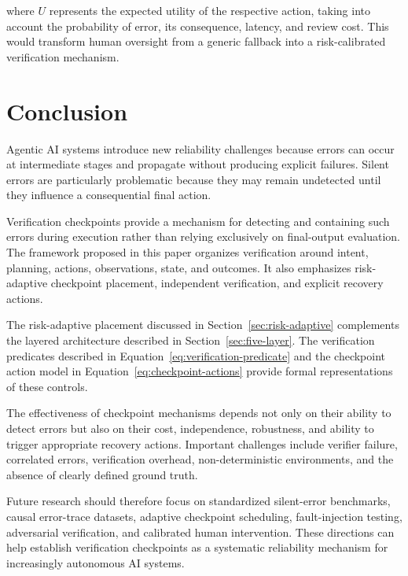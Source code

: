 \documentclass[12pt]{article}
\begin{document}
where $U$ represents the expected utility of the respective action, taking
into account the probability of error, its consequence, latency, and review
cost. This would transform human oversight from a generic fallback into a
risk-calibrated verification mechanism.

\section{Conclusion}
\label{sec:conclusion}

Agentic AI systems introduce new reliability challenges because errors can occur
at intermediate stages and propagate without producing explicit failures. Silent
errors are particularly problematic because they may remain undetected until
they influence a consequential final action.

Verification checkpoints provide a mechanism for detecting and containing such
errors during execution rather than relying exclusively on final-output
evaluation. The framework proposed in this paper organizes verification around
intent, planning, actions, observations, state, and outcomes. It also emphasizes
risk-adaptive checkpoint placement, independent verification, and explicit
recovery actions.

The risk-adaptive placement discussed in
Section~\ref{sec:risk-adaptive} complements the layered architecture described
in Section~\ref{sec:five-layer}. The verification predicates described in
Equation~\ref{eq:verification-predicate} and the checkpoint action model in
Equation~\ref{eq:checkpoint-actions} provide formal representations of these
controls.

The effectiveness of checkpoint mechanisms depends not only on their ability to
detect errors but also on their cost, independence, robustness, and ability to
trigger appropriate recovery actions. Important challenges include verifier
failure, correlated errors, verification overhead, non-deterministic
environments, and the absence of clearly defined ground truth.

Future research should therefore focus on standardized silent-error benchmarks,
causal error-trace datasets, adaptive checkpoint scheduling, fault-injection
testing, adversarial verification, and calibrated human intervention. These
directions can help establish verification checkpoints as a systematic
reliability mechanism for increasingly autonomous AI systems.

\clearpage



\nocite{yao2023react}
\nocite{schick2023toolformer}
\nocite{wu2023autogen}
\nocite{liu2024agentbench}
\nocite{jimenez2024swebench}
\nocite{mohammadi2025evaluation}
\nocite{yehudai2026survey}
\nocite{wei2022cot}
\nocite{wang2023selfconsistency}
\nocite{lightman2023verify}
\nocite{manakul2023selfcheckgpt}
\nocite{min2023factscore}
\nocite{es2024ragas}
\nocite{zheng2023judge}
\nocite{liu2024lost}
\nocite{perez2022redteam}
\nocite{kim2026agentic}


\end{document}
